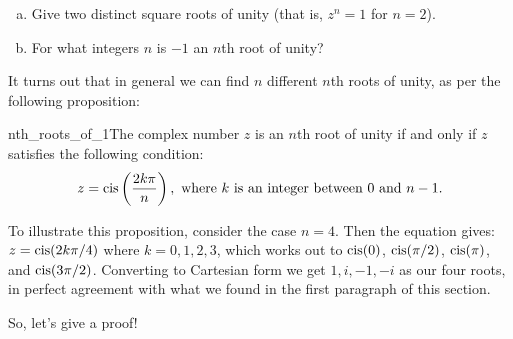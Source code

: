 \begin{exercise}{48}
\begin{enumerate}[(a)]
\item
Give two distinct square roots of unity (that is, $z^n = 1$ for $n=2$).
\item
For what integers $n$ is $-1$ an $n$th root of unity?
\end{enumerate}
\end{exercise}

It turns out that in general we can find $n$ different $n$th roots of unity, as per the following proposition:

\begin{prop}{nth_roots_of_1}The complex number $z$ is an $n$th root of unity if and only if $z$ satisfies the following condition:
\[
z=\operatorname{cis}\left(\frac{2k\pi}{n}\right), \text{ where } k \text{ is an integer between }0 \text{ and } n-1.\] 
\end{prop}

To illustrate this proposition, consider the case $n=4$. Then the equation gives: $z=\operatorname{cis}(2k\pi/4)$  where $k=0,1,2,3$, which works out to $\operatorname{cis}(0)$, $\operatorname{cis}(\pi/2)$, $\operatorname{cis}(\pi)$, and $\operatorname{cis}(3\pi/2)$.  Converting to Cartesian form we get  $1, i , -1, -i$ as our four roots, in perfect agreement with what we found in the first paragraph of this section.

So, let's give a proof!

